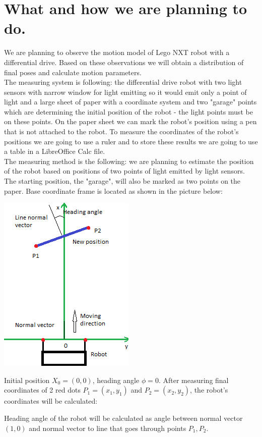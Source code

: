 \documentclass[a4paper, 12pt]{article}
\begin{document}
\section{What and how we are planning to do.}
We are planning to observe the motion model of Lego NXT robot with a differential drive. Based on these observations we will obtain a distribution of final poses and calculate motion parameters.\\
The measuring system is following: the differential drive robot with two light sensors with narrow window for light emitting so it would emit only a point of light and a large sheet of paper with a coordinate system and two "garage" points which are determining the initial position of the robot - the light points must be on these points. On the paper sheet we can mark the robot's position using a pen that is not attached to the robot. To measure the coordinates of the robot's positions we are going to use a ruler and to store these results we are going to use a table in a LibreOffice Calc file.\\
The measuring method is the following: we are planning to estimate the position of the robot based on positions of two points of light emitted by light sensors. The starting position, the "garage", will also be marked as two points on the paper.
Base coordinate frame is located as shown in the picture below:
\begin{center}
\includegraphics[scale =1]{frame.png}
\end{center}
Initial position $X_0 = (0,0)$, heading angle $\phi = 0$. After measuring final coordinates of 2 red dots $P_1 = (x_1,y_1)$ and $P_2=(x_2,y_2)$, the robot's coordinates will be calculated:

Heading angle of the robot will be calculated as angle between normal vector $(1,0)$ and normal vector to line that goes through points $P_1,P_2.$
\end{document}
